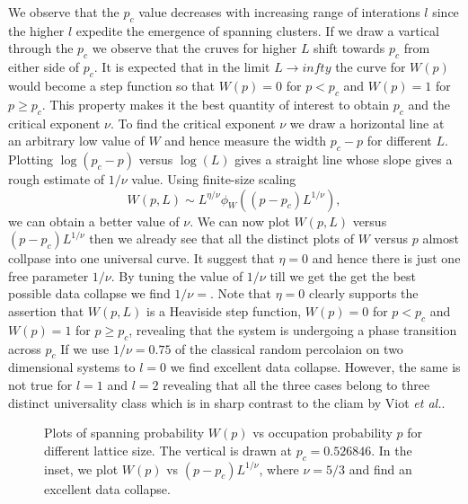\documentclass[twocolumn,showpacs,preprintnumbers,amsmath,amssymb]{article}
\begin{document}
We observe that the $p_c$ value decreases with increasing range of interations $l$ since the 
higher $l$ expedite the emergence of spanning clusters. If we draw a vartical through the $p_c$ we observe 
that the cruves for higher $L$ shift towards $p_c$ from either side of $p_c$. It is expected
 that in the limit $L\rightarrow infty$ the curve
for $W(p)$ would become a step function so that $W(p)=0$ for $p<p_c$ and $W(p)=1$ for $p\geq p_c$. This property makes
it the best quantity of interest to obtain $p_c$ and the critical exponent $\nu$. To find the critical
exponent $\nu$ we draw a horizontal line at an arbitrary low value of $W$ and hence
measure the width $p_c-p$ for different $L$. Plotting $\log(p_c-p)$ versus $\log(L)$ gives a straight line
whose slope gives a rough estimate of $1/\nu$ value. Using finite-size scaling
\begin{equation}
W(p,L)\sim L^{\eta/\nu}\phi_W((p-p_c)L^{1/\nu}),
\end{equation}
we can obtain a better value of $\nu$. We can now plot $W(p,L)$ versus $(p-p_c)L^{1/\nu}$ then we already see that all the distinct plots of $W$ versus $p$
almost collpase into one universal curve. It suggest that $\eta=0$ and hence there is just one free parameter $1/\nu$. By tuning the value of $1/\nu$ till we get the
get the best possible data collapse we find $1/\nu=$. Note that $\eta=0$ clearly supports 
the assertion that $W(p,L)$ is a Heaviside step function, $W(p)=0$ for $p<p_c$ and $W(p)=1$ for $p\geq p_c$, revealing that the system is undergoing a phase transition across $p_c$  
If we use $1/\nu=0.75$ of the classical random percolaion on two dimensional systems to $l=0$ we find excellent data collapse. However, the same is not true for $l=1$ and $l=2$ revealing that
all the three cases belong to three distinct universality class which is in sharp contrast to the cliam by Viot {\it et al.}.


\begin{figure}
\label{fig2}
\caption{Plots of spanning probability $W(p)$ vs  occupation probability $p$ for different lattice size. The vertical is drawn at $p_c=0.526846$. In the inset, 
we plot  $W(p)$ vs $(p-p_c)L^{1/\nu}$, where $\nu=5/3$ and find an excellent data collapse.
}
\end{figure}
\end{document}
